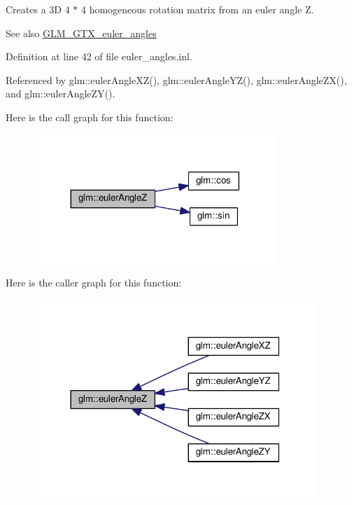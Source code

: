 Creates a 3D 4 $\ast$ 4 homogeneous rotation matrix from an euler angle Z. \begin{DoxySeeAlso}{See also}
\hyperlink{group__gtx__euler__angles}{G\+L\+M\+\_\+\+G\+T\+X\+\_\+euler\+\_\+angles} 
\end{DoxySeeAlso}


Definition at line 42 of file euler\+\_\+angles.\+inl.



Referenced by glm\+::euler\+Angle\+X\+Z(), glm\+::euler\+Angle\+Y\+Z(), glm\+::euler\+Angle\+Z\+X(), and glm\+::euler\+Angle\+Z\+Y().

Here is the call graph for this function\+:
\nopagebreak
\begin{figure}[H]
\begin{center}
\leavevmode
\includegraphics[width=260pt]{d2/d7e/group__gtx__euler__angles_ga5b3935248bb6c3ec6b0d9297d406e251_cgraph}
\end{center}
\end{figure}
Here is the caller graph for this function\+:
\nopagebreak
\begin{figure}[H]
\begin{center}
\leavevmode
\includegraphics[width=303pt]{d2/d7e/group__gtx__euler__angles_ga5b3935248bb6c3ec6b0d9297d406e251_icgraph}
\end{center}
\end{figure}
\mbox{\label{group__gtx__euler__angles_ga483903115cd4059228961046a28d69b5}} 
